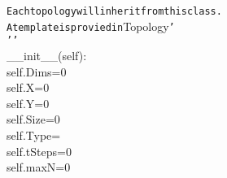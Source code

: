{{\begin{tabbing}
{\texttt{\hspace{48pt}Each\hspace{6pt}topology\hspace{6pt}will\hspace{6pt}inherit\hspace{6pt}from\hspace{6pt}this\hspace{6pt}class.}}\\
{\texttt{\hspace{48pt}A\hspace{6pt}template\hspace{6pt}is\hspace{6pt}provied\hspace{6pt}in\hspace{6pt}{'}}}Topology{\texttt{{'}}}\\
{\texttt{\hspace{24pt}{'}}}{\texttt{{'}{'}}}\\
\hspace{6pt}\_\_init\_\_(self):\\
\hspace{48pt}self.Dims\hspace{6pt}=\hspace{6pt}0\\
\hspace{48pt}self.X\hspace{6pt}=\hspace{6pt}0\\
\hspace{48pt}self.Y\hspace{6pt}=\hspace{6pt}0\\
\hspace{48pt}self.Size\hspace{6pt}=\hspace{6pt}0\\
\hspace{48pt}self.Type\hspace{6pt}=\\
\hspace{48pt}self.tSteps\hspace{6pt}=\hspace{6pt}0\\
\hspace{48pt}self.maxN\hspace{6pt}=\hspace{6pt}0\\

\end{tabbing}}}
